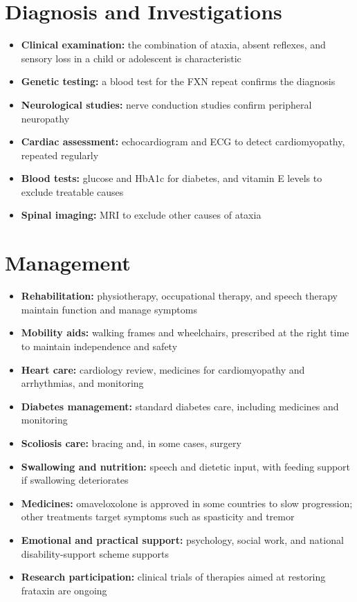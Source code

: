 \section*{Diagnosis and Investigations}
\begin{itemize}
    \item \textbf{Clinical examination:} the combination of ataxia, absent reflexes, and sensory loss in a child or adolescent is characteristic
    \item \textbf{Genetic testing:} a blood test for the FXN repeat confirms the diagnosis
    \item \textbf{Neurological studies:} nerve conduction studies confirm peripheral neuropathy
    \item \textbf{Cardiac assessment:} echocardiogram and ECG to detect cardiomyopathy, repeated regularly
    \item \textbf{Blood tests:} glucose and HbA1c for diabetes, and vitamin E levels to exclude treatable causes
    \item \textbf{Spinal imaging:} MRI to exclude other causes of ataxia
\end{itemize}

\section*{Management}
\begin{itemize}
    \item \textbf{Rehabilitation:} physiotherapy, occupational therapy, and speech therapy maintain function and manage symptoms
    \item \textbf{Mobility aids:} walking frames and wheelchairs, prescribed at the right time to maintain independence and safety
    \item \textbf{Heart care:} cardiology review, medicines for cardiomyopathy and arrhythmias, and monitoring
    \item \textbf{Diabetes management:} standard diabetes care, including medicines and monitoring
    \item \textbf{Scoliosis care:} bracing and, in some cases, surgery
    \item \textbf{Swallowing and nutrition:} speech and dietetic input, with feeding support if swallowing deteriorates
    \item \textbf{Medicines:} omaveloxolone is approved in some countries to slow progression; other treatments target symptoms such as spasticity and tremor
    \item \textbf{Emotional and practical support:} psychology, social work, and national disability-support scheme supports
    \item \textbf{Research participation:} clinical trials of therapies aimed at restoring frataxin are ongoing
\end{itemize}

